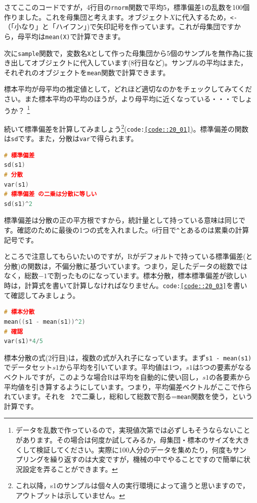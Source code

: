 \documentclass{ltjsbook}
\begin{document}
さてここのコードですが，4行目の\texttt{rnorm}関数で平均5，標準偏差1の乱数を100個作りました。これを母集団と考えます。オブジェクト$X$に代入するため，\verb|<-|（「小なり」と「ハイフン」)で矢印記号を作っています。これが母集団ですから，母平均は\texttt{mean(X)}で計算できます。

次に\texttt{sample}関数で，変数名\texttt{X}として作った母集団から5個のサンプルを無作為に抜き出してオブジェクトに代入しています(8行目など)。サンプルの平均はまた，それぞれのオブジェクトを\texttt{mean}関数で計算できます。

標本平均が母平均の推定値として，どれほど適切なのかをチェックしてみてください。また標本平均の平均のほうが，より母平均に近くなっている・・・でしょうか？ \footnote{データを乱数で作っているので，実現値次第では必ずしもそうならないことがあります。その場合は何度か試してみるか，母集団・標本のサイズを大きくして検証してください。実際に100人分のデータを集めたり，何度もサンプリングを繰り返すのは大変ですが，機械の中でやることですので簡単に状況設定を弄ることができます。}

続いて標準偏差を計算してみましょう\footnote{これ以降，s1のサンプルは個々人の実行環境によって違うと思いますので，アウトプットは示していません。}(\texttt{code:\ref{code::20_01}})。標準偏差の関数は\texttt{sd}です。また，分散は\texttt{var}で得られます。
\begin{lstlisting}[language=c++,label={code::20_02},caption={関数で標準偏差や分散を求める}]
# 標準偏差
sd(s1)
# 分散
var(s1)
# 標準偏差 の二乗は分散に等しい
sd(s1)^2
\end{lstlisting}
標準偏差は分散の正の平方根ですから，統計量として持っている意味は同じです。確認のために最後の1つの式を入れました。6行目で\texttt{\^}とあるのは累乗の計算記号です。

ところで注意してもらいたいのですが，Rがデフォルトで持っている標準偏差(と分散)の関数は，不偏分散に基づいています。つまり，足したデータの総数ではなく，総数$-1$で割ったものになっています。標本分散，標本標準偏差が欲しい時は，計算式を書いて計算しなければなりません。\texttt{code:\ref{code::20_03}}を書いて確認してみましょう。
\begin{lstlisting}[language=c++,label={code::20_03},caption={標本分散を求める}]
# 標本分散
mean((s1 - mean(s1))^2)
# 確認
var(s1)*4/5
\end{lstlisting}

標本分散の式(2行目)は，複数の式が入れ子になっています。まず\texttt{s1 - mean(s1)}でデータセット$s1$から平均を引いています。平均値は1つ，$s1$は5つの要素がなるベクトルですが，このような場合Rは平均を自動的に使い回し，$s1$の各要素から平均値を引き算するようにしています。つまり，平均偏差ベクトルがここで作られています。それを\texttt{\^　2}で二乗し，総和して総数で割る=\texttt{mean}関数を使う，という計算です。
\end{document}
